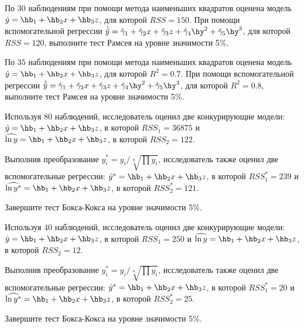 \documentclass[pdftex,11pt,openany]{book}\usepackage[]{graphicx}\usepackage[]{color}
\begin{document}
\begin{problem}
По $30$ наблюдениям при помощи метода наименьших квадратов оценена
модель $\hat{y}=\hb_1+\hb_2 x +\hb_3 z$, для которой $RSS = 150$. При помощи вспомогательной регрессии $\hat{\hat{y}}=\hat{\gamma}_1+\hat{\gamma}_2 x +\hat{\gamma}_3 z+\hat{\gamma}_4 \hy^2+\hat{\gamma}_5 \hy^3$, для которой $RSS = 120$, выполните тест Рамсея на уровне значимости 5\%. 
\end{problem}
\begin{solution}
\end{solution}


\begin{problem}
По $35$ наблюдениям при помощи метода наименьших квадратов оценена
модель $\hat{y}=\hb_1+\hb_2 x +\hb_3 z$, для которой $R^2 = 0.7$. При помощи вспомогательной регрессии $\hat{\hat{y}}=\hat{\gamma}_1+\hat{\gamma}_2 x +\hat{\gamma}_3 z+\hat{\gamma}_4 \hy^2+\hat{\gamma}_5 \hy^3$, для которой $R^2 = 0.8$, выполните тест Рамсея на уровне значимости 5\%. 
\end{problem}

\begin{solution}
\end{solution}

\begin{problem}
Используя 80 наблюдений, исследователь оценил две конкурирующие модели: $\hat{y}=\hb_1+\hb_2 x +\hb_3 z$, в которой $RSS_1=36875$ и $\widehat{\ln y}=\hb_1+\hb_2 x +\hb_3 z$, в которой $RSS_2=122$. 

Выполнив преобразование $y^*_i=y_i/\sqrt[n]{\prod y_i}$, исследователь также оценил две вспомогательные регрессии: $\hat{y}^*=\hb_1+\hb_2 x +\hb_3 z$, в которой $RSS^*_1=239$ и $\widehat{\ln y^*}=\hb_1+\hb_2 x +\hb_3 z$, в которой $RSS^*_2=121$.

Завершите тест Бокса-Кокса на уровне значимости 5\%.
\end{problem}

\begin{solution}
\end{solution}

\begin{problem}
Используя 40 наблюдений, исследователь оценил две конкурирующие модели: $\hat{y}=\hb_1+\hb_2 x +\hb_3 z$, в которой $RSS_1=250$ и $\widehat{\ln y}=\hb_1+\hb_2 x +\hb_3 z$, в которой $RSS_2=12$. 

Выполнив преобразование $y^*_i=y_i/\sqrt[n]{\prod y_i}$, исследователь также оценил две вспомогательные регрессии: $\hat{y}^*=\hb_1+\hb_2 x +\hb_3 z$, в которой $RSS^*_1=20$ и $\widehat{\ln y^*}=\hb_1+\hb_2 x +\hb_3 z$, в которой $RSS^*_2=25$.

Завершите тест Бокса-Кокса на уровне значимости 5\%.
\end{problem}
\end{document}
